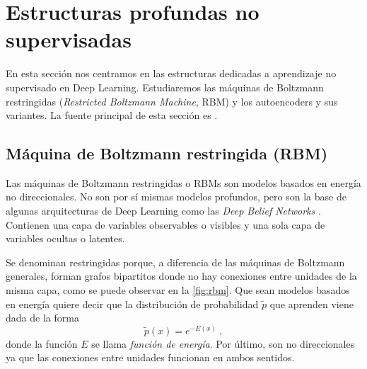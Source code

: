 \section{Estructuras profundas no
supervisadas}\label{estructuras-profundas-no-supervisadas}

En esta sección nos centramos en las estructuras dedicadas a aprendizaje no supervisado en Deep Learning. Estudiaremos las máquinas de Boltzmann restringidas (\textit{Restricted Boltzmann Machine}, RBM) y los autoencoders y sus variantes. La fuente principal de esta sección es \textcite[capítulos 14 y 20]{goodfellow2016}.

\subsection{Máquina de Boltzmann restringida
(RBM)}\label{muxe1quina-de-boltzmann-restringidas-rbm}

Las máquinas de Boltzmann restringidas o RBMs son modelos basados en energía no direccionales. No son por sí mismas modelos profundos, pero son la base de algunas arquitecturas de Deep Learning como las \textit{Deep Belief Networks} \autocite{hinton2006dbn}. Contienen una capa de variables observables o visibles y una sola capa de variables ocultas o latentes.

Se denominan restringidas porque, a diferencia de las máquinas de Boltzmann generales, forman grafos bipartitos donde no hay conexiones entre unidades de la misma capa, como se puede observar en la \autoref{fig:rbm}. Que sean modelos basados en energía quiere decir que la distribución de probabilidad $\tilde p$ que aprenden viene dada de la forma
\[
  \tilde p(x)=e^{-E(x)}~,
\]
donde la función $E$ se llama \textit{función de energía}. Por último, son no direccionales ya que las conexiones entre unidades funcionan en ambos sentidos.

